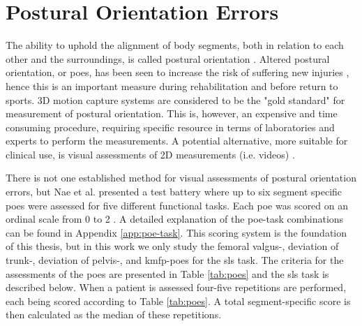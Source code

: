 
\section{Postural Orientation Errors}
The ability to uphold the alignment of body segments, both in relation to each other and the surroundings, is called postural orientation \cite{Horak2006}. Altered postural orientation, or \glspl{poe}, has been seen to increase the risk of suffering new injuries \cite{Hewett2005}, hence this is an important measure during rehabilitation and before return to sports. 3D motion capture systems are considered to be the "gold standard" for measurement of postural orientation. This is, however, an expensive and time consuming procedure, requiring specific resource in terms of laboratories and experts to perform the measurements. A potential alternative, more suitable for clinical use, is visual assessments of 2D measurements (i.e. videos) \cite{Nae2020}.

There is not one established method for visual assessments of postural orientation errors, but Nae et al. presented a test battery where up to six segment specific \glspl{poe} were assessed for five different functional tasks. Each \gls{poe} was scored on an ordinal scale from 0 to 2 \cite{Nae2017, Nae2020b}.
A detailed explanation of the \gls{poe}-task combinations can be found in Appendix \ref{app:poe-task}. This scoring system is the foundation of this thesis, but in this work we only study the femoral valgus-, deviation of trunk-, deviation of pelvis-, and \gls{kmfp}-\glspl{poe} for the \gls{sls} task. The criteria for the assessments of the \glspl{poe} are presented in Table \ref{tab:poes} and the \gls{sls} task is described below. When a patient is assessed four-five repetitions are performed, each being scored according to Table \ref{tab:poes}. A total segment-specific score is then calculated as the median of these repetitions.

